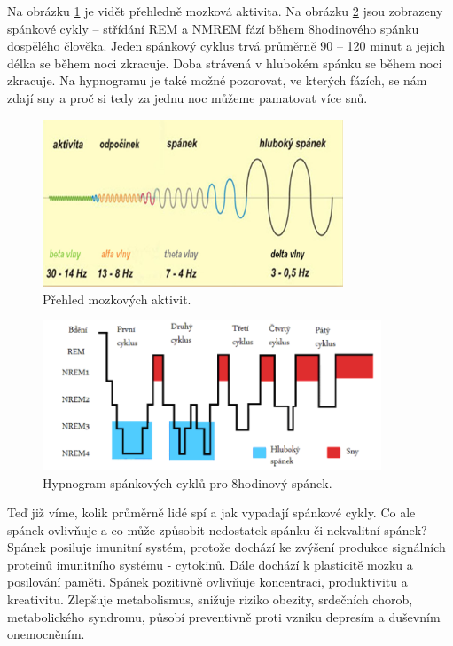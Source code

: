 \documentclass[a4paper]{scrartcl}
\begin{document}
Na obrázku \ref{fig:vlny_mozkove} je vidět přehledně mozková aktivita.
Na obrázku \ref{fig:hypnogram_spanku} jsou zobrazeny spánkové cykly -- 
střídání REM a NMREM fází během 8hodinového spánku dospělého člověka.
Jeden spánkový cyklus trvá průměrně 90 -- 120 minut a jejich délka se
během noci zkracuje.
Doba strávená v hlubokém spánku se během noci zkracuje. Na hypnogramu je
také možné pozorovat, ve kterých fázích, se nám zdají sny a proč si
tedy za jednu noc můžeme pamatovat více snů. 

        \begin{figure}
            \centering
            \includegraphics[width=0.8\textwidth]{aktivitamozku.png}
            \caption{Přehled mozkových aktivit.\cite{mozkove_vlny_reference}}
            \label{fig:vlny_mozkove}
        \end{figure}
        
        \begin{figure}
            \centering
            \includegraphics[width=0.9\textwidth]{hypnogram_8hod.png}
            \caption{Hypnogram spánkových cyklů pro 8hodinový spánek.\cite{Vitu_ukladani_ke_spanku}}
            \label{fig:hypnogram_spanku}
        \end{figure}

Teď již víme, kolik průměrně lidé spí a jak vypadají spánkové cykly.
Co ale spánek ovlivňuje a co může způsobit nedostatek spánku či 
nekvalitní spánek? 
Spánek posiluje imunitní systém, protože dochází ke zvýšení
produkce signálních proteinů imunitního systému - cytokinů. \cite{imunitni_system_sleep}
Dále dochází k plasticitě mozku a posilování paměti. 
Spánek pozitivně ovlivňuje
koncentraci, produktivitu a kreativitu. Zlepšuje metabolismus, snižuje
riziko obezity, srdečních chorob, metabolického syndromu, působí
preventivně proti vzniku depresím a duševním onemocněním. \cite{why_we_sleep_fletcher}
\end{document}
